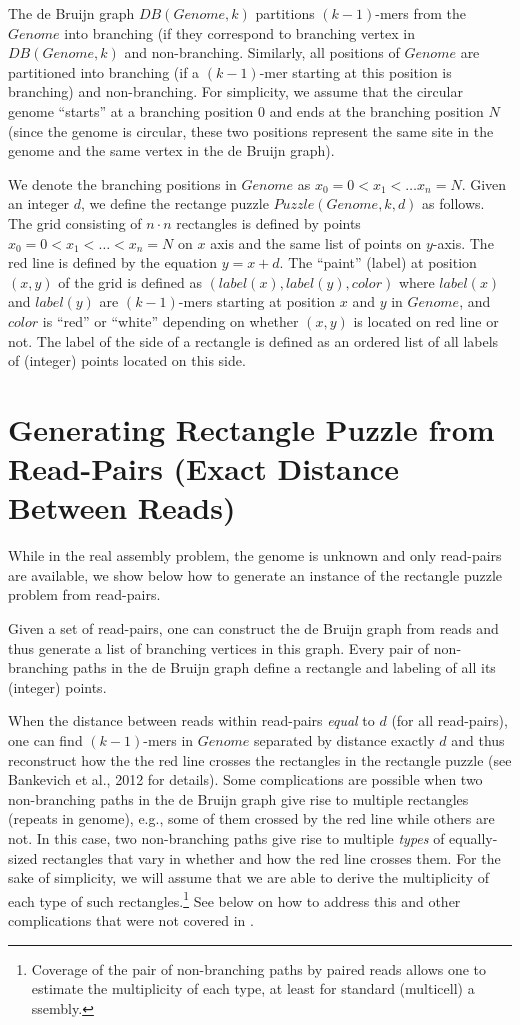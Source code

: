 \documentclass[a4paper]{article}
\begin{document}
The de Bruijn graph $DB(Genome,k)$ partitions $(k-1)$-mers from the $Genome$ into branching (if they correspond to branching vertex in $DB(Genome,k)$ and non-branching. Similarly, all 
positions of $Genome$ are partitioned into branching (if a $(k-1)$-mer  starting at this position is branching) and non-branching. For simplicity, we assume that the circular genome ``starts'' at a branching position 0 and ends at the branching position $N$ (since the genome is circular, these two positions represent the same site in the genome and the same vertex in the de Bruijn graph).  

We denote the branching positions in $Genome$ as $x_0=0 < x_1 < \ldots x_n=N$.  
Given an integer $d$, we define the rectange puzzle $Puzzle(Genome,k,d)$ as follows. The grid consisting of $n \cdot n$ rectangles is defined by points $x_0=0 < x_1 < \ldots <x_n=N$ on $x$ axis and the same list of points on $y$-axis. The red line is defined by the equation $y=x+d$.  The ``paint'' (label) at position $(x,y)$ of the grid is defined as $(label(x),label(y),color)$ where $label(x)$ and  $label(y)$ are 
$(k-1)$-mers starting at position $x$ and $y$ in $Genome$, and $color$  
is ``red'' or ``white'' depending on whether $(x,y)$ is located on red line or not. 
The label of the side of a rectangle is defined as an ordered list of all labels of (integer) points located on this side. 

\section{Generating Rectangle Puzzle from Read-Pairs (Exact Distance Between Reads)}

While in the real assembly problem, the genome is unknown and only read-pairs are available, we show below how to generate an instance of the rectangle puzzle problem from read-pairs. 

 Given a set of read-pairs, one can construct the de Bruijn graph from reads and thus generate a list of branching vertices in this graph. Every pair of non-branching paths in the de Bruijn graph define a rectangle and labeling of all its (integer) points.  

When the distance between reads within read-pairs {\em equal} to $d$ (for all read-pairs), one can find $(k-1)$-mers in $Genome$ separated by distance exactly $d$ and thus reconstruct how the the red line crosses the rectangles in the rectangle puzzle (see Bankevich et al., 2012 for details).  Some complications are possible when two non-branching paths  in the de Bruijn graph give rise to multiple rectangles (repeats in genome), e.g., some of them crossed by the red line while others are not. In this case, two non-branching paths give rise to multiple {\em types} of equally-sized rectangles that vary in whether and how the red line crosses them.  For the sake of simplicity, we will assume that we are able to derive the multiplicity of  each type of such rectangles.\footnote{Coverage of the pair of non-branching paths by paired reads allows one to estimate the multiplicity of each type, at least for standard (multicell) a
ssembly.}  See below on how to address this and other complications that were not covered in \cite{Bankevich12}. 
\end{document}
